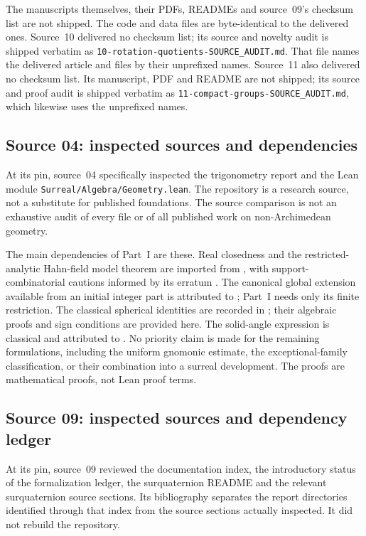 \documentclass[11pt,letterpaper]{article}
\numberwithin{equation}{section}
\theoremstyle{definition}
\theoremstyle{remark}
\begin{document}
The manuscripts themselves, their PDFs, READMEs and source~09's checksum list
are not shipped. The code and data files are byte-identical to the delivered
ones. Source~10 delivered no checksum list; its source and novelty audit is
shipped verbatim as \texttt{10-rotation-quotients-SOURCE\_AUDIT.md}. That file
names the delivered article and files by their unprefixed names. Source~11 also
delivered no checksum list. Its manuscript, PDF and README are not shipped; its
source and proof audit is shipped verbatim as
\texttt{11-compact-groups-SOURCE\_AUDIT.md}, which likewise uses the unprefixed
names.

\subsection{Source 04: inspected sources and dependencies}

At its pin, source~04 specifically inspected the trigonometry report and the
Lean module \texttt{Surreal/Algebra/Geometry.lean}. The repository is a
research source, not a substitute for published foundations. The source
comparison is not an exhaustive audit of every file or of all published
work on non-Archimedean geometry.

The main dependencies of Part~I are these. Real closedness and the
restricted-analytic Hahn-field model theorem are imported from
\cite{vdDE}, with support-combinatorial cautions informed by its erratum
\cite{vdDEErr}. The canonical global extension available from an initial
integer part is attributed to \cite{EK}; Part~I needs only its finite
restriction. The classical spherical identities are recorded in
\cite{DLMF}; their algebraic proofs and sign conditions are provided
here. The solid-angle expression is classical and attributed to
\cite{Oosterom}. No priority claim is made for the remaining formulations,
including the uniform gnomonic estimate, the exceptional-family
classification, or their combination into a surreal development.
The proofs are mathematical proofs, not Lean proof terms.

\subsection{Source 09: inspected sources and dependency ledger}

At its pin, source~09 reviewed the documentation index, the introductory
status of the formalization ledger, the surquaternion README and the relevant
surquaternion source sections. Its bibliography separates the report
directories identified through that index from the source sections actually
inspected. It did not rebuild the repository.
\end{document}

